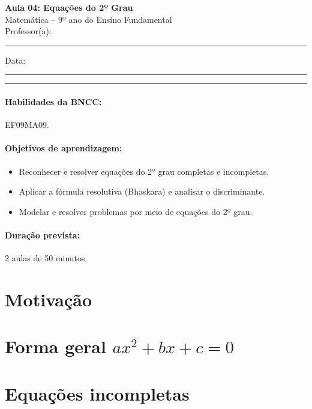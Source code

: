\documentclass[11pt,a4paper]{article}
\newcommand{\numaula}{04}
\newcommand{\tituloaula}{Equações do 2º Grau}
\begin{document}
\begin{center}
  {\Large\bfseries Aula \numaula: \tituloaula}\\[4pt]
  {\large Matemática -- 9º ano do Ensino Fundamental}\\[2pt]
  Professor(a): \rule{6cm}{0.4pt} \qquad Data: \rule{3cm}{0.4pt}
\end{center}
\noindent\rule{\linewidth}{0.8pt}

\paragraph{Habilidades da BNCC:} EF09MA09.

\paragraph{Objetivos de aprendizagem:}
\begin{itemize}[nosep]
  \item Reconhecer e resolver equações do 2º grau completas e incompletas.
  \item Aplicar a fórmula resolutiva (Bhaskara) e analisar o discriminante.
  \item Modelar e resolver problemas por meio de equações do 2º grau.
\end{itemize}

\paragraph{Duração prevista:} 2 aulas de 50 minutos. %

\section{Motivação}

\section{Forma geral $ax^2+bx+c=0$}

\section{Equações incompletas}
\end{document}
